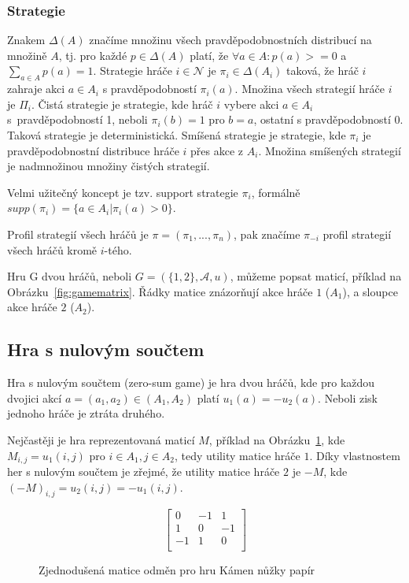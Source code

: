 \subsubsection{Strategie}

Znakem $\Delta(A)$ značíme množinu všech pravděpodobnostních distribucí na množině $A$, tj. pro každé $p \in \Delta(A)$ platí, že $\forall a \in A: p(a) >= 0$ a $\sum_{a \in A} p(a) = 1$. 
Strategie hráče $i \in \mathcal{N}$ je $\pi_i \in \Delta(A_i)$ taková, že hráč $i$ zahraje akci $a \in A_i$ s pravděpodobností $\pi_i(a)$. Množina všech strategií hráče $i$ je $\Pi_i$.
Čistá strategie je strategie, kde hráč $i$ vybere akci $a \in A_i$ s~pravděpodobností 1, neboli $\pi_i(b) = 1$ pro $b=a$, ostatní s pravděpodobností $0$. Taková strategie je deterministická.
Smíšená strategie je strategie, kde $\pi_i$ je pravděpodobnostní distribuce hráče $i$ přes akce z $A_i$. Množina smíšených strategií je nadmnožinou množiny čistých strategií. \cite{Balko}

Velmi užitečný koncept je tzv. support strategie $\pi_i$, formálně $supp(\pi_i) = \{a \in A_i | \pi_i(a) > 0 \}$\cite{Schmid}. 

Profil strategií všech hráčů je $\pi = (\pi_1, ..., \pi_n)$, pak značíme $\pi_{-i}$ profil strategií všech hráčů kromě $i$-tého.  

Hru G dvou hráčů, neboli $G = (\{1,2\}, \mathcal{A}, u)$, můžeme popsat maticí, příklad na Obrázku~\ref{fig:gamematrix}. Řádky matice znázorňují akce hráče $1$ ($A_1$), a sloupce akce hráče $2$ ($A_2$).  

\subsection{Hra s nulovým součtem} 

Hra s nulovým součtem (zero-sum game) je hra dvou hráčů, kde pro každou dvojici akcí $a=(a_1, a_2) \in (A_1, A_2)$ platí $u_1(a) = -u_2(a)$. Neboli zisk jednoho hráče je ztráta druhého. 

Nejčastěji je hra reprezentovaná maticí $M$, příklad na Obrázku~\ref{fig:zerosummatrix}, kde $M_{i,j} = u_1(i, j)$ pro $i \in A_1, j \in A_2$, tedy utility matice hráče $1$. Díky vlastnostem her s nulovým součtem je zřejmé, že utility matice hráče $2$ je $-M$, kde $(-M)_{i,j} = u_2(i,j) = -u_1(i,j)$.   

\begin{figure}
    \centering
    \caption{Zjednodušená matice odměn pro hru Kámen nůžky papír}
    \[
    \begin{bmatrix}
        0 & -1 & 1 \\
        1 & 0 & -1 \\
        -1 & 1 & 0 \\
    \end{bmatrix}
    \]
    \label{fig:zerosummatrix}
\end{figure}

